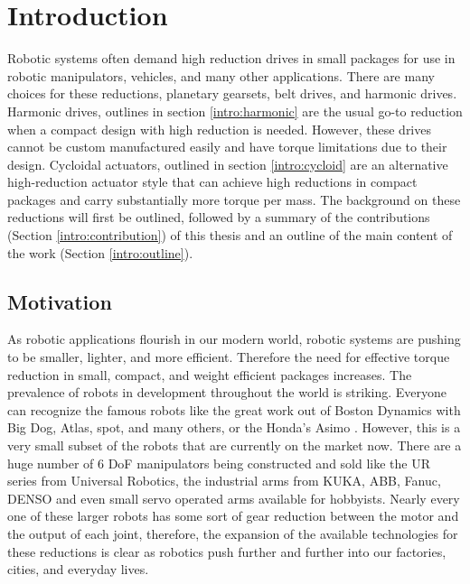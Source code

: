 
\chapter{Introduction}\label{ch:intro}
Robotic systems often demand high reduction drives in small packages for use in robotic manipulators, vehicles, and many other applications. There are many choices for these reductions, planetary gearsets, belt drives, and harmonic drives. Harmonic drives, outlines in section \ref{intro:harmonic} are the usual go-to reduction when a compact design with high reduction is needed. However, these drives cannot be custom manufactured easily and have torque limitations due to their design. Cycloidal actuators, outlined in section \ref{intro:cycloid} are an alternative high-reduction actuator style that can achieve high reductions in compact packages and carry substantially more torque per mass. The background on these reductions will first be outlined, followed by a summary of the contributions (Section \ref{intro:contribution}) of this thesis and an outline of the main content of the work (Section \ref{intro:outline}). 

\section{Motivation} \label{intro:motivation}

As robotic applications flourish in our modern world, robotic systems are pushing to be smaller, lighter, and more efficient. 
Therefore the need for effective torque reduction in small, compact, and weight efficient packages increases. 
The prevalence of robots in development throughout the world is striking. 
Everyone can recognize the famous robots like the great work out of Boston Dynamics with Big Dog, Atlas, spot, and many others, or the Honda's Asimo \cite{ref:asimo}.
However, this is a very small subset of the robots that are currently on the market now. 
There are a huge number of 6 DoF manipulators being constructed and sold like the UR series from Universal Robotics, the industrial arms from KUKA, ABB, Fanuc, DENSO and even small servo operated arms available for hobbyists. 
Nearly every one of these larger robots has some sort of gear reduction between the motor and the output of each joint, therefore, the expansion of the available technologies for these reductions is clear as robotics push further and further into our factories, cities, and everyday lives. 

